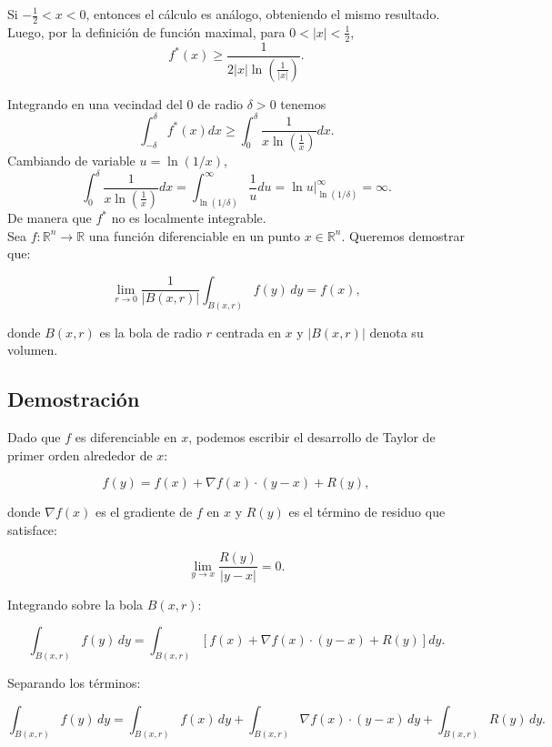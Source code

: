 \documentclass{article}
\begin{document}
Si $-\frac{1}{2} < x < 0$, entonces el c\'alculo es an\'alogo, obteniendo el mismo resultado. Luego, por la definici\'on de funci\'on maximal, para $0 < |x| < \frac{1}{2}$,
\begin{equation*}
    f^*(x) \geq \frac{1}{2|x| \ln \left(\frac{1}{|x|}\right)}.
\end{equation*}

Integrando en una vecindad del $0$ de radio $\delta > 0$ tenemos
\begin{equation*}
    \int_{-\delta}^{\delta} f^*(x) dx \geq \int_{0}^{\delta} \frac{1}{x \ln \left(\frac{1}{x}\right)} dx.
\end{equation*}
Cambiando de variable $u = \ln(1/x)$,
\begin{equation*}
    \int_{0}^{\delta} \frac{1}{x \ln \left(\frac{1}{x}\right)} dx = \int_{\ln(1/\delta)}^{\infty} \frac{1}{u} du = \ln u \Big|_{\ln(1/\delta)}^{\infty} = \infty.
\end{equation*}
De manera que $f^*$ no es localmente integrable.\\

Sea \( f: \mathbb{R}^n \to \mathbb{R} \) una función diferenciable en un punto \( x \in \mathbb{R}^n \). Queremos demostrar que:

\[
\lim_{r \to 0} \frac{1}{|B(x,r)|} \int_{B(x,r)} f(y) \, dy = f(x),
\]

donde \( B(x,r) \) es la bola de radio \( r \) centrada en \( x \) y \( |B(x,r)| \) denota su volumen.

\subsection*{Demostración}

Dado que \( f \) es diferenciable en \( x \), podemos escribir el desarrollo de Taylor de primer orden alrededor de \( x \):

\[
f(y) = f(x) + \nabla f(x) \cdot (y - x) + R(y),
\]

donde \( \nabla f(x) \) es el gradiente de \( f \) en \( x \) y \( R(y) \) es el término de residuo que satisface:

\[
\lim_{y \to x} \frac{R(y)}{|y - x|} = 0.
\]

Integrando sobre la bola \( B(x,r) \):

\[
\int_{B(x,r)} f(y) \, dy = \int_{B(x,r)} \left[ f(x) + \nabla f(x) \cdot (y - x) + R(y) \right] dy.
\]

Separando los términos:

\[
\int_{B(x,r)} f(y) \, dy = \int_{B(x,r)} f(x) \, dy + \int_{B(x,r)} \nabla f(x) \cdot (y - x) \, dy + \int_{B(x,r)} R(y) \, dy.
\]
\end{document}
